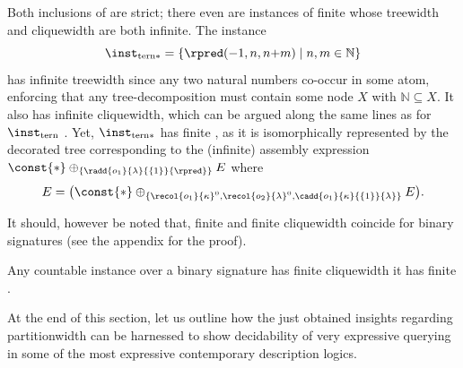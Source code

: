 


Both inclusions of  are strict; there even are instances of finite \hypercliquewidth{} whose treewidth and cliquewidth are both infinite. The instance 
$$\inst_\mathrm{tern*} = \{ \rpred(-1,n,n{+}m) \mid n,m\in \mathbb{N}\}$$%
has infinite treewidth since any two natural numbers co-occur in some atom, enforcing that any tree-decomposition must contain some node $X$ with $\mathbb{N} \subseteq  X$.  
It also has infinite cliquewidth, which can be argued along the same lines as for $\inst_\mathrm{tern}$ \cite{ICDT2023}.
Yet, $\inst_\mathrm{tern*}$ has finite \ercwidth{}, as it is isomorphically represented by the decorated tree corresponding to the (infinite) assembly expression
$
\const{*} \oplus_{\{
\radd{o_1}{\lambda}{\{1\}}{\rpred}
\}} E
$
where
$$
E = \big( \const{*} \oplus_{\{
\recol{o_1}{\kappa}^0, 
\recol{o_2}{\lambda}^0,
\cadd{o_1}{\kappa}{\{1\}}{\lambda}
\}} E \big).
$$

It should, however be noted that, finite \ercwidth{} and finite cliquewidth coincide for binary signatures (see the appendix for the proof).

\begin{proposition}\label{th:hcw=cw-bin}
	Any countable instance over a binary signature has finite cliquewidth \iffi it has finite \ercwidth{}.
\end{proposition}

At the end of this section, let us outline how the just obtained insights regarding partitionwidth can be harnessed to show decidability of very expressive querying in some of the most expressive contemporary description logics.



